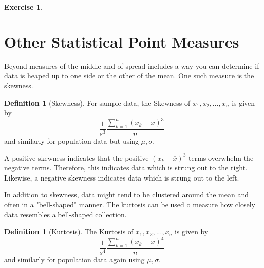 \documentclass[10pt,]{book}
\theoremstyle{plain}
\theoremstyle{definition}
\newtheorem{definition}[theorem]{Definition}
\theoremstyle{definition}
\theoremstyle{definition}
\newtheorem{exercise}[theorem]{Exercise}
\numberwithin{equation}{section}
\begin{document}
%
\begin{exercise}\label{exercise-2}
\end{exercise}
\typeout{************************************************}
\typeout{************************************************}
\section[{Other Statistical Point Measures}]{Other Statistical Point Measures}\label{section-7}
Beyond measures of the middle and of spread includes a way you can determine if data is heaped up to one side or the other of the mean. One such measure is the skewness.
%
\begin{definition}[{Skewness}]\label{definition-12}
For sample data, the Skewness of \(x_1, x_2, ..., x_n\) is given by
\begin{equation*} \frac{1}{s^3} \frac{\sum_{k=1}^n ( x_k-\overline{x} )^3}{n}\end{equation*}
and similarly for population data but using \(\mu, \sigma\).%
\end{definition}
\par

A positive skewness indicates that the positive \((x_k - \overline{x})^3\) terms overwhelm the negative terms. Therefore, this indicates data which is strung out to the right. Likewise, a negative skewness indicates data which is strung out to the left.
%
\par

In addition to skewness, data might tend to be clustered around the mean and often in a "bell-shaped" manner. The kurtosis can be used o measure how closely data resembles a bell-shaped collection.
%
\begin{definition}[{Kurtosis}]\label{definition-13}
The Kurtosis of \(x_1, x_2, ..., x_n\) is given by
\begin{equation*} \frac{1}{s^4} \frac{\sum_{k=1}^n ( x_k-\overline{x} )^4}{n}\end{equation*}
and similarly for population data again using \(\mu, \sigma\).
%
\end{definition}
\par
\end{document}
